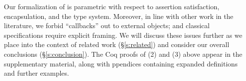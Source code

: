 Our formalization of \Nec %
{  is 
parametric} with respect to assertion
satisfaction, encapsulation, and the type system.
{{Moreover, in line} with other work in the literature,} we forbid 
``callbacks'' out to external objects; and
classical specifications require explicit framing.
We will discuss these  issues %
further as we place \Nec into the context of 
related work (\S\ref{s:related}) and consider our overall conclusions
(\S\ref{s:conclusion}). 
%
The Coq proofs of 
(2) and (3) above appear in the
supplementary material, along with ppendices containing expanded 
definitions and further examples.
